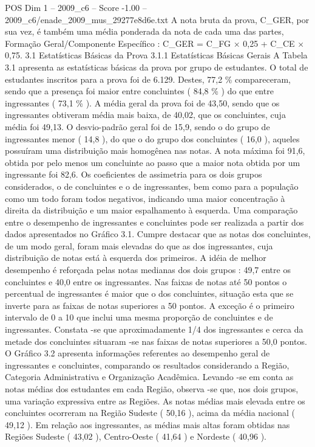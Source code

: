\begin{textsample}{POS Dim 1 – 2009\_c6 – Score -1.00 – 2009\_c6/enade\_2009\_mus\_29277e8d6e.txt}
A nota bruta da prova, C\_GER, por sua vez, é também uma média ponderada da nota de cada uma das partes, Formação Geral/Componente Específico : C\_GER = C\_FG × 0,25 + C\_CE × 0,75. 3.1 Estatísticas Básicas da Prova 3.1.1 Estatísticas Básicas Gerais A Tabela 3.1 apresenta as estatísticas básicas da prova por grupo de estudantes.
O total de estudantes inscritos para a prova foi de 6.129.
Destes, 77,2 \% compareceram, sendo que a presença foi maior entre concluintes ( 84,8 \% ) do que entre ingressantes ( 73,1 \% ).
A média geral da prova foi de 43,50, sendo que os ingressantes obtiveram média mais baixa, de 40,02, que os concluintes, cuja média foi 49,13.
O desvio-padrão geral foi de 15,9, sendo o do grupo de ingressantes menor ( 14,8 ), do que o do grupo dos concluintes ( 16,0 ), aqueles possuíram uma distribuição mais homogênea nas notas.
A nota máxima foi 91,6, obtida por pelo menos um concluinte ao passo que a maior nota obtida por um ingressante foi 82,6.
Os coeficientes de assimetria para os dois grupos considerados, o de concluintes e o de ingressantes, bem como para a população como um todo foram todos negativos, indicando uma maior concentração à direita da distribuição e um maior espalhamento à esquerda.
Uma comparação entre o desempenho de ingressantes e concluintes pode ser realizada a partir dos dados apresentados no Gráfico 3.1.
Cumpre destacar que as notas dos concluintes, de um modo geral, foram mais elevadas do que as dos ingressantes, cuja distribuição de notas está à esquerda dos primeiros.
A idéia de melhor desempenho é reforçada pelas notas medianas dos dois grupos : 49,7 entre os concluintes e 40,0 entre os ingressantes.
Nas faixas de notas até 50 pontos o percentual de ingressantes é maior que o dos concluintes, situação esta que se inverte para as faixas de notas superiores a 50 pontos.
A exceção é o primeiro intervalo de 0 a 10 que inclui uma mesma proporção de concluintes e de ingressantes.
Constata -se que aproximadamente 1/4 dos ingressantes e cerca da metade dos concluintes situaram -se nas faixas de notas superiores a 50,0 pontos.
O Gráfico 3.2 apresenta informações referentes ao desempenho geral de ingressantes e concluintes, comparando os resultados considerando a Região, Categoria Administrativa e Organização Acadêmica.
Levando -se em conta as notas médias dos estudantes em cada Região, observa -se que, nos dois grupos, uma variação expressiva entre as Regiões.
As notas médias mais elevada entre os concluintes ocorreram na Região Sudeste ( 50,16 ), acima da média nacional ( 49,12 ).
Em relação aos ingressantes, as médias mais altas foram obtidas nas Regiões Sudeste ( 43,02 ), Centro-Oeste ( 41,64 ) e Nordeste ( 40,96 ).

\end{textsample}
